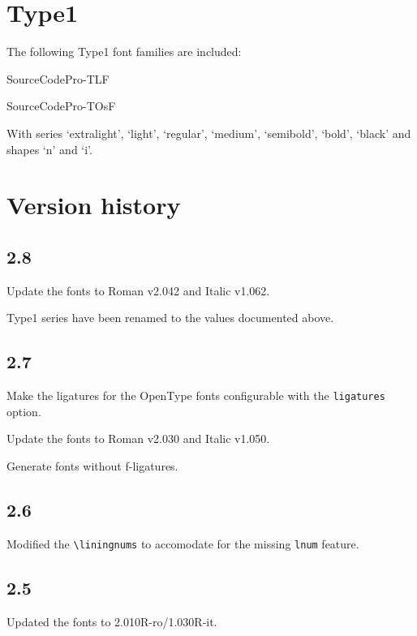 \documentclass[10pt,a4paper,english]{article}
\begin{document}
\begin{multicols}{2}
\section{Type1}
The following Type1 font families are included:
\begin{itemize*}
	\item SourceCodePro-TLF
	\item SourceCodePro-TOsF
\end{itemize*}

With series ‘extralight’, ‘light’, ‘regular’, ‘medium’, ‘semibold’, ‘bold’, ‘black’ and shapes ‘n’ and ‘i’.

\section{Version history}
\subsection*{2.8}
\begin{itemize*}
	\item Update the fonts to Roman v2.042 and Italic v1.062.
	\item Type1 series have been renamed to the values documented above.
\end{itemize*}

\subsection*{2.7}
\begin{itemize*}
	\item Make the ligatures for the OpenType fonts configurable with the \texttt{ligatures} option.
	\item Update the fonts to Roman v2.030 and Italic v1.050.
	\item Generate fonts without f-ligatures.
\end{itemize*}

\subsection*{2.6}
\begin{itemize*}
	\item Modified the \texttt{\textbackslash liningnums} to accomodate for the missing \texttt{lnum} feature.
\end{itemize*}

\subsection*{2.5}
\begin{itemize*}
	\item Updated the fonts to 2.010R-ro/1.030R-it.
\end{itemize*}


\end{multicols}
\end{document}
